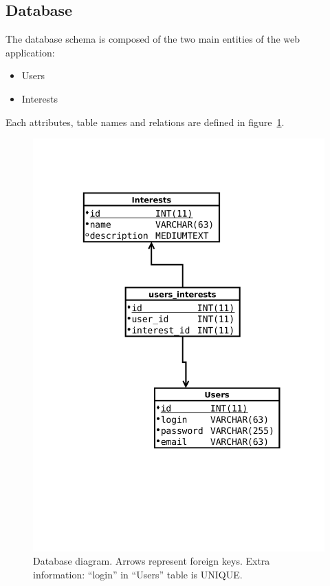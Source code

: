 \documentclass[a4paper,11pt,openany]{report}
\begin{document}
\subsection{Database}
The database schema is composed of the two main entities of the web application:
\begin{itemize}
 \item Users
 \item Interests
\end{itemize}
Each attributes, table names and relations are defined in figure~\ref{figure:database}.

\begin{figure}[h!t]
  \includegraphics[trim=0 200 0 110,clip,width=\textwidth]{database.pdf}
  \caption{Database diagram. Arrows represent foreign keys. Extra information: ``login'' in ``Users'' table is UNIQUE.}
  \label{figure:database}
\end{figure}
  
\end{document}
